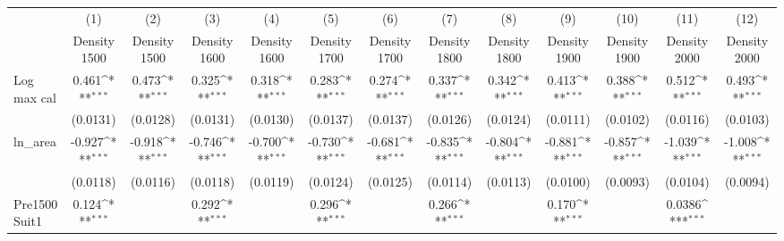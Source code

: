 {
\def\sym#1{\ifmmode^{#1}\else\(^{#1}\)\fi}
\begin{tabular}{l*{12}{c}}
\toprule
                    &\multicolumn{1}{c}{(1)}&\multicolumn{1}{c}{(2)}&\multicolumn{1}{c}{(3)}&\multicolumn{1}{c}{(4)}&\multicolumn{1}{c}{(5)}&\multicolumn{1}{c}{(6)}&\multicolumn{1}{c}{(7)}&\multicolumn{1}{c}{(8)}&\multicolumn{1}{c}{(9)}&\multicolumn{1}{c}{(10)}&\multicolumn{1}{c}{(11)}&\multicolumn{1}{c}{(12)}\\
                    &\multicolumn{1}{c}{Density 1500}&\multicolumn{1}{c}{Density 1500}&\multicolumn{1}{c}{Density 1600}&\multicolumn{1}{c}{Density 1600}&\multicolumn{1}{c}{Density 1700}&\multicolumn{1}{c}{Density 1700}&\multicolumn{1}{c}{Density 1800}&\multicolumn{1}{c}{Density 1800}&\multicolumn{1}{c}{Density 1900}&\multicolumn{1}{c}{Density 1900}&\multicolumn{1}{c}{Density 2000}&\multicolumn{1}{c}{Density 2000}\\
\midrule
Log max cal         &       0.461\sym{***}&       0.473\sym{***}&       0.325\sym{***}&       0.318\sym{***}&       0.283\sym{***}&       0.274\sym{***}&       0.337\sym{***}&       0.342\sym{***}&       0.413\sym{***}&       0.388\sym{***}&       0.512\sym{***}&       0.493\sym{***}\\
                    &    (0.0131)         &    (0.0128)         &    (0.0131)         &    (0.0130)         &    (0.0137)         &    (0.0137)         &    (0.0126)         &    (0.0124)         &    (0.0111)         &    (0.0102)         &    (0.0116)         &    (0.0103)         \\
\addlinespace
ln\_area             &      -0.927\sym{***}&      -0.918\sym{***}&      -0.746\sym{***}&      -0.700\sym{***}&      -0.730\sym{***}&      -0.681\sym{***}&      -0.835\sym{***}&      -0.804\sym{***}&      -0.881\sym{***}&      -0.857\sym{***}&      -1.039\sym{***}&      -1.008\sym{***}\\
                    &    (0.0118)         &    (0.0116)         &    (0.0118)         &    (0.0119)         &    (0.0124)         &    (0.0125)         &    (0.0114)         &    (0.0113)         &    (0.0100)         &    (0.0093)         &    (0.0104)         &    (0.0094)         \\
\addlinespace
Pre1500 Suit1       &       0.124\sym{***}&                     &       0.292\sym{***}&                     &       0.296\sym{***}&                     &       0.266\sym{***}&                     &       0.170\sym{***}&                     &      0.0386\sym{***}&                     \\

\end{tabular}}
